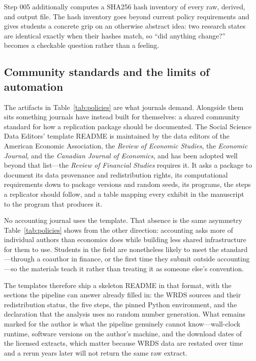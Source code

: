 \documentclass[12pt]{article}
\begin{document}
Step 005 additionally computes a SHA256 hash inventory of every raw,
derived, and output file. The hash inventory goes beyond current policy
requirements and gives students a concrete grip on an otherwise abstract
idea: two research states are identical exactly when their hashes match,
so ``did anything change?'' becomes a checkable question rather than a
feeling.

\subsection{Community standards and the limits of automation}

The artifacts in Table~\ref{tab:policies} are what journals demand.
Alongside them sits something journals have instead built for
themselves: a shared community standard for how a replication package
should be documented. The Social Science Data Editors' template README
\citep{vilhuber2022readme} is maintained by the data editors of the
American Economic Association, the \textit{Review of Economic Studies},
the \textit{Economic Journal}, and the \textit{Canadian Journal of
Economics}, and has been adopted well beyond that list---the
\textit{Review of Financial Studies} requires it. It asks a package to
document its data provenance and redistribution rights, its
computational requirements down to package versions and random seeds,
its programs, the steps a replicator should follow, and a table mapping
every exhibit in the manuscript to the program that produces it.

No accounting journal uses the template. That absence is the same
asymmetry Table~\ref{tab:policies} shows from the other direction:
accounting asks more of individual authors than economics does while
building less shared infrastructure for them to use. Students in the
field are nonetheless likely to meet the standard---through a coauthor
in finance, or the first time they submit outside accounting---so the
materials teach it rather than treating it as someone else's convention.

The templates therefore ship a skeleton README in that format, with the
sections the pipeline can answer already filled in: the WRDS sources and
their redistribution status, the five steps, the pinned Python
environment, and the declaration that the analysis uses no random number
generation. What remains marked for the author is what the pipeline
genuinely cannot know---wall-clock runtime, software versions on the
author's machine, and the download dates of the licensed extracts, which
matter because WRDS data are restated over time and a rerun years later
will not return the same raw extract.
\end{document}

